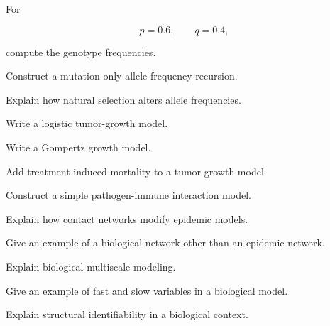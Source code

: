 \begin{exercise}[2]
For

\[
p=0.6,
\qquad
q=0.4,
\]

compute the genotype frequencies.
\end{exercise}

\begin{exercise}[3]
Construct a mutation-only allele-frequency recursion.
\end{exercise}

\begin{exercise}[3]
Explain how natural selection alters allele frequencies.
\end{exercise}

\begin{exercise}[2]
Write a logistic tumor-growth model.
\end{exercise}

\begin{exercise}[2]
Write a Gompertz growth model.
\end{exercise}

\begin{exercise}[3]
Add treatment-induced mortality to a tumor-growth model.
\end{exercise}

\begin{exercise}[3]
Construct a simple pathogen-immune interaction model.
\end{exercise}

\begin{exercise}[3]
Explain how contact networks modify epidemic models.
\end{exercise}

\begin{exercise}[3]
Give an example of a biological network other than an epidemic network.
\end{exercise}

\begin{exercise}[3]
Explain biological multiscale modeling.
\end{exercise}

\begin{exercise}[3]
Give an example of fast and slow variables in a biological model.
\end{exercise}

\begin{exercise}[3]
Explain structural identifiability in a biological context.
\end{exercise}

